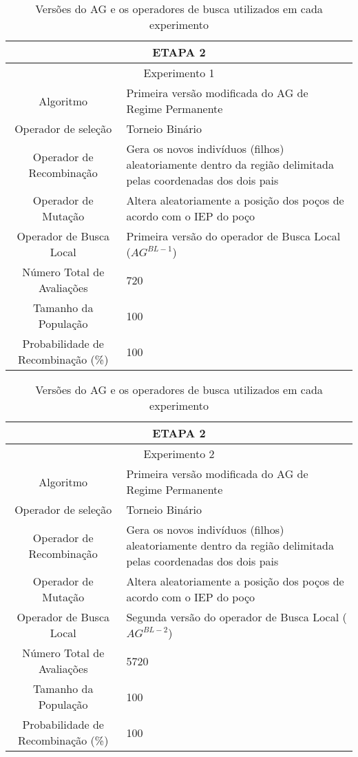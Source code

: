 \documentclass[12pt,a4paper]{report}
\begin{document}
 \begin{table}[H]
\centering
\caption{Versões do AG e os operadores de busca utilizados em cada experimento}

\begin{tabular}{|c|p{10cm}|}
 \hline
 \multicolumn{2}{|c|}{ETAPA 2} \\ \hline
 \multicolumn{2}{|c|}{Experimento 1} \\ \hline
 {Algoritmo} & Primeira versão modificada do AG de Regime Permanente  \\ \hline
 Operador de seleção & Torneio Binário \\ \hline
 Operador de Recombinação & Gera os novos indivíduos (filhos) aleatoriamente dentro da região delimitada pelas coordenadas dos dois pais \\  \hline
 Operador de Mutação & Altera aleatoriamente a posição dos poços de acordo com o IEP do poço \\ \hline
 Operador de Busca Local & Primeira versão do operador de Busca Local ($AG^{BL-1}$) \\ \hline
 Número Total de Avaliações & 720 \\ \hline
 Tamanho da População & 100 \\ \hline
 Probabilidade de Recombinação (\%) & 100 \\ \hline
 
 
\end{tabular}
\end{table} 
 
 \begin{table}[H]
\centering
\caption{Versões do AG e os operadores de busca utilizados em cada experimento}

\begin{tabular}{|c|p{10cm}|}
 \hline
 \multicolumn{2}{|c|}{ETAPA 2} \\ \hline
 \multicolumn{2}{|c|}{Experimento 2} \\ \hline
 {Algoritmo} & Primeira versão modificada do AG de Regime Permanente \\ \hline
 Operador de seleção & Torneio Binário \\ \hline
 Operador de Recombinação & Gera os novos indivíduos (filhos) aleatoriamente dentro da região delimitada pelas coordenadas dos dois pais \\  \hline
 Operador de Mutação & Altera aleatoriamente a posição dos poços de acordo com o IEP do poço \\ \hline
 Operador de Busca Local & Segunda versão do operador de Busca Local ($AG^{BL-2}$) \\ \hline
 Número Total de Avaliações & 5720 \\ \hline
 Tamanho da População & 100 \\ \hline
 Probabilidade de Recombinação (\%) & 100 \\ \hline
 
 
 
\end{tabular}
\end{table}
\end{document}
